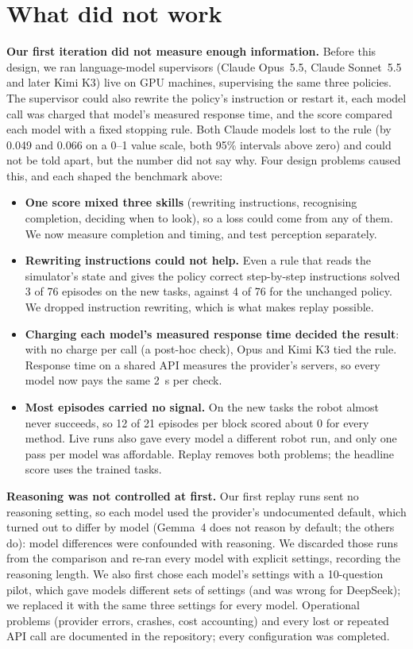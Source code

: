\documentclass[10pt,twocolumn,letterpaper]{article}
\begin{document}
\section{What did not work}
\label{sec:didnotwork}
\textbf{Our first iteration did not measure enough information.} Before this design, we ran language-model supervisors (Claude
Opus~5.5, Claude Sonnet~5.5 and later Kimi K3) live on GPU machines, supervising the same three policies. The
supervisor could also rewrite the policy's instruction or restart it, each model call was charged that model's
measured response time, and the score compared each model with a fixed stopping rule. Both Claude models lost to the
rule (by 0.049 and 0.066 on a 0--1 value scale, both 95\% intervals above zero) and could not be told apart, but
the number did not say why. Four design problems caused this, and each shaped the benchmark above:
\begin{itemize}
\item \textbf{One score mixed three skills} (rewriting instructions, recognising completion, deciding when to look),
so a loss could come from any of them. We now measure completion and timing, and test perception separately.
\item \textbf{Rewriting instructions could not help.} Even a rule that reads the simulator's state and gives the policy
correct step-by-step instructions solved 3 of 76 episodes on the new tasks, against 4 of 76 for the unchanged policy.
We dropped instruction rewriting, which is what makes replay possible.
\item \textbf{Charging each model's measured response time decided the result}: with no charge per call (a post-hoc
check), Opus and Kimi K3 tied the rule. Response time on a shared API measures the provider's servers, so every model
now pays the same 2~s per check.
\item \textbf{Most episodes carried no signal.} On the new tasks the robot almost never succeeds, so 12 of 21 episodes
per block scored about 0 for every method. Live runs also gave every model a different robot run, and only one pass
per model was affordable. Replay removes both problems; the headline score uses the trained tasks.
\end{itemize}

\textbf{Reasoning was not controlled at first.} Our first replay runs sent no reasoning setting, so each model used
the provider's undocumented default, which turned out to differ by model (Gemma~4 does not reason by default; the
others do): model differences were confounded with reasoning. We discarded those runs from the comparison and re-ran
every model with explicit settings, recording the reasoning length. We also first chose each model's settings with a
10-question pilot, which gave models different sets of settings (and was wrong for DeepSeek); we replaced it with the
same three settings for every model. Operational problems (provider errors, crashes, cost accounting) and every lost
or repeated API call are documented in the repository; every configuration was completed.
\end{document}
